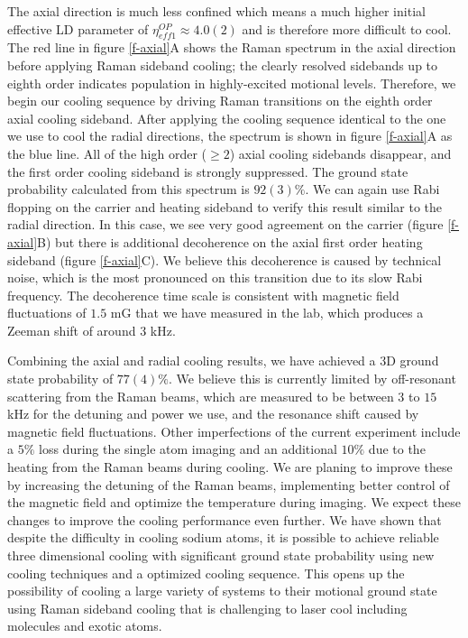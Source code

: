 \documentclass[aps,prl,twocolumn,groupedaddress]{revtex4-1}
\begin{document}
The axial direction is much less confined which means a much higher initial
effective LD parameter of $\eta^{OP}_{eff1}\approx 4.0(2)$ and is therefore more difficult to cool.
The red line in figure \ref{f-axial}A shows the Raman spectrum in the axial direction
before applying Raman sideband cooling; the clearly resolved sidebands
up to eighth order indicates population in highly-excited motional levels.
Therefore, we begin our cooling sequence by driving Raman transitions on the eighth order axial
cooling sideband. After applying the cooling sequence identical to the one we use to cool
the radial directions, the spectrum is shown in figure \ref{f-axial}A as the blue line.
All of the high order ($\geqslant2$) axial cooling sidebands disappear, and the first order
cooling sideband is strongly suppressed.
The ground state probability calculated from this spectrum is $92(3)\%$.
We can again use Rabi flopping on the carrier and heating sideband to verify this result
similar to the radial direction. In this case, we see very good agreement on the carrier
(figure \ref{f-axial}B) but there is additional decoherence on the axial first order
heating sideband (figure \ref{f-axial}C).
We believe this decoherence is caused by technical noise, which is the most pronounced
on this transition due to its slow Rabi frequency.
The decoherence time scale is consistent with magnetic field fluctuations of $1.5$ mG that we have measured in the lab, which produces
a Zeeman shift of around $3$ kHz.

Combining the axial and radial cooling results,
we have achieved a 3D ground state probability of $77(4)\%$.
We believe this is currently limited by off-resonant scattering from the Raman beams,
which are measured to be between $3$ to $15$ kHz for the detuning and power we use,
and the resonance shift caused by magnetic field fluctuations.
Other imperfections of the current experiment include a $5\%$ loss during the single atom
imaging and an additional $10\%$ due to the heating from the Raman beams during cooling.
We are planing to improve these by increasing the detuning of the Raman beams,
implementing better control of the magnetic field and optimize the temperature during imaging.
We expect these changes to improve the cooling performance even further.
We have shown that despite the difficulty in cooling sodium atoms,
it is possible to achieve reliable three dimensional cooling with significant ground state
probability using new cooling techniques and a optimized cooling sequence.
This opens up the possibility of cooling a large variety of systems to their motional ground
state using Raman sideband cooling that is challenging to laser cool
including molecules and exotic atoms.



\end{document}
